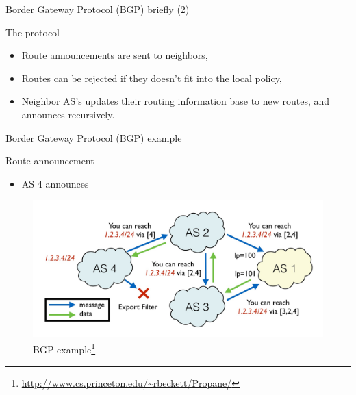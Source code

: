 \begin{frame}{Border Gateway Protocol (BGP) briefly (2)}
    \begin{block}{The protocol}
        \begin{itemize}
            \item Route announcements are sent to neighbors,
            \item Routes can be \textcolor{ReneOrange}{rejected} if they doesn't fit into the local policy,
            \item Neighbor AS's updates their routing information base to new routes, and announces recursively.
        \end{itemize}
    \end{block}
\end{frame}

\begin{frame}{Border Gateway Protocol (BGP) example}
    \begin{block}{Route announcement}
        \begin{itemize}
            \item AS 4 announces 
        \end{itemize}
    \end{block}
    \begin{figure}
        \includegraphics[height=0.45\textheight,keepaspectratio]{figures/BGP-protocol.jpg}
        \caption*{BGP example\footnote{\url{http://www.cs.princeton.edu/~rbeckett/Propane/}}}
    \end{figure}
\end{frame}

